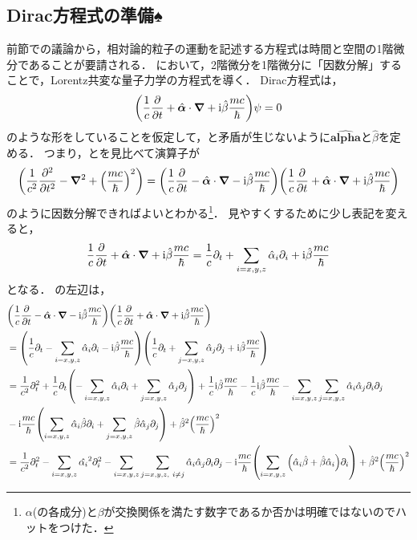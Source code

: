 \documentclass{report}
\begin{document}
  \subsection{Dirac方程式の準備♠}
    前節での議論から，相対論的粒子の運動を記述する方程式は時間と空間の1階微分であることが要請される．
    において，2階微分を1階微分に「因数分解」することで，Lorentz共変な量子力学の方程式を導く．
    Dirac方程式は，
    \begin{align}
      \qty(\frac{1}{c}\pdv{t} + \hat{\bm{\alpha}} \cdot \grad + \mathrm{i}\hat{\beta} \frac{mc}{\hbar})\psi = 0 \label{Dirac-pre}
    \end{align}
    のような形をしていることを仮定して，と矛盾が生じないように$\hat{\bm{alpha}}$と$\hat{\beta}$を定める．
    つまり，とを見比べて演算子が
    \begin{align}
      \qty(\frac{1}{c^2}\pdv[2]{t} - \grad^2 + \qty(\frac{mc}{\hbar})^2) = \qty(\frac{1}{c}\pdv{t} - \hat{\bm{\alpha}} \cdot \grad - \mathrm{i}\hat{\beta} \frac{mc}{\hbar})\qty(\frac{1}{c}\pdv{t} + \hat{\bm{\alpha}} \cdot \grad + \mathrm{i}\hat{\beta} \frac{mc}{\hbar})
    \end{align}
    のように因数分解できればよいとわかる\footnote{$\alpha$(の各成分)と$\beta$が交換関係を満たす数字であるか否かは明確ではないのでハットをつけた．}．
    見やすくするために少し表記を変えると，
    \begin{align}
      \frac{1}{c}\pdv{t} + \hat{\bm{\alpha}} \cdot \grad + \mathrm{i}\hat{\beta} \frac{mc}{\hbar} = \frac{1}{c}\partial_t + \sum_{i = x, y, z} \hat{\alpha}_i \partial_i + \mathrm{i}\hat{\beta} \frac{mc}{\hbar}
    \end{align}
    となる．
    の左辺は，
    \begin{align}
      &\qty(\frac{1}{c}\pdv{t} - \hat{\bm{\alpha}} \cdot \grad - \mathrm{i}\hat{\beta} \frac{mc}{\hbar})\qty(\frac{1}{c}\pdv{t} + \hat{\bm{\alpha}} \cdot \grad + \mathrm{i}\hat{\beta} \frac{mc}{\hbar}) \\
      &=\qty(\frac{1}{c}\partial_t - \sum_{i = x, y, z} \hat{\alpha}_i \partial_i - \mathrm{i}\hat{\beta} \frac{mc}{\hbar}) \qty(\frac{1}{c}\partial_t + \sum_{j = x, y, z} \hat{\alpha}_j \partial_j + \mathrm{i}\hat{\beta} \frac{mc}{\hbar})\\
      &= \frac{1}{c^2}\partial_t^2 + \frac{1}{c} \partial_t \qty(-\sum_{i = x, y, z} \hat{\alpha}_i \partial_i + \sum_{j = x,y,z} \hat{\alpha}_j \partial_j) + \frac{1}{c}\mathrm{i}\hat{\beta}\frac{mc}{\hbar} - \frac{1}{c}\mathrm{i}\hat{\beta}\frac{mc}{\hbar} 
      - \sum_{i = x, y, z} \sum_{j = x, y, z} \hat{\alpha}_i \hat{\alpha}_j \partial_i \partial_j\\ 
      &-\mathrm{i}\frac{mc}{\hbar}\qty(\sum_{i = x, y, z} \hat{\alpha}_i \hat{\beta} \partial_i + \sum_{j = x, y, z} \hat{\beta} \hat{\alpha}_j \partial_j)
      + \hat{\beta}^2\qty(\frac{mc}{\hbar})^2\\
      &= \frac{1}{c^2}\partial_t^2 - \sum_{i = x, y, z} \hat{\alpha_i}^2 \partial_i^2 - \sum_{i = x, y, z} \sum_{j = x, y, z,\ i \neq j} \hat{\alpha}_i \hat{\alpha}_j \partial_i \partial_j
      -\mathrm{i}\frac{mc}{\hbar}\qty(\sum_{i = x, y, z} \qty( \hat{\alpha}_i \hat{\beta} + \hat{\beta} \hat{\alpha}_i )\partial_i) + \hat{\beta}^2\qty(\frac{mc}{\hbar})^2
    \end{align}
\end{document}
